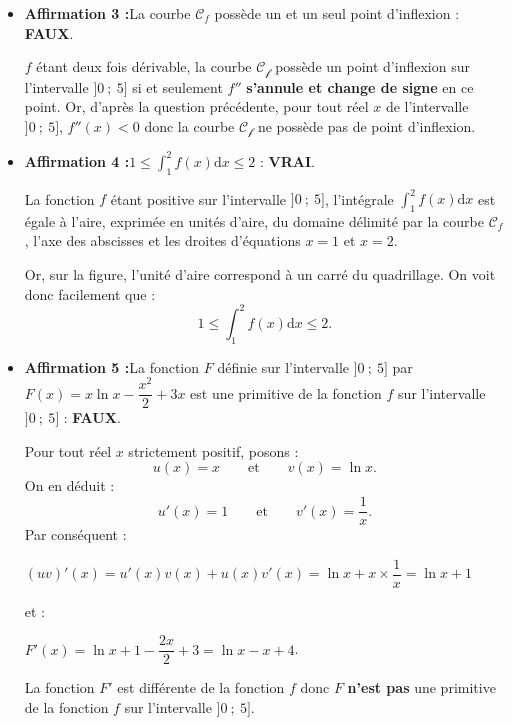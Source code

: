 \begin{corrige}
\begin{itemize}
          \par
          \item %
          \textbf{Affirmation 3 :}\quad La courbe $\mathscr{C}_f$ possède un et un seul point d'inflexion : \textbf{FAUX}.
          \par
          $f$ étant deux fois dérivable, la courbe $\mathscr{C_f}$ possède un point d'inflexion sur l'intervalle $]0~;~5]$ si et seulement $f''$ \textbf{s'annule et change de signe} en ce point. Or, d'après la question précédente, pour tout réel $x$ de l'intervalle $]0~;~5]$, $f''(x)<0$ donc la courbe $\mathscr{C_f}$ ne possède pas de point d'inflexion.
          \item %
          \textbf{Affirmation 4 :}\quad $1 \leqslant \displaystyle\int_{1}^{2}f(x)\text{d}x \leqslant 2$ : \textbf{VRAI}.
          \par
          La fonction $f$ étant positive sur l'intervalle $]0~;~5]$, l'intégrale $\displaystyle\int_{1}^{2}f(x)\text{d}x$ est égale à l'aire, exprimée en unités d'aire, du domaine délimité par la courbe $\mathscr{C}_f$, l'axe des abscisses et les droites d'équations $x=1$ et $x=2$.
          \par
          Or, sur la figure, l'unité d'aire correspond à un carré du quadrillage. On voit donc facilement que :
          \[ 1 \leqslant \displaystyle\int_{1}^{2}f(x)\text{d}x \leqslant 2. \]
          \item %
          \textbf{Affirmation 5 :}\quad La fonction $F$ définie sur l'intervalle $]0~;~5]$ par $F(x) =  x\ln x - \dfrac{x^2}{2} + 3x $ est une primitive de la fonction $f$ sur l'intervalle $]0~;~5]$ : \textbf{FAUX}.
          \par
          Pour tout réel $x$ strictement positif, posons :
          \[ u(x)=x \qquad \text{et} \qquad v(x)=\ln x. \]
          On en déduit :
          \[ u'(x)=1 \qquad \text{et} \qquad  v'(x)=\dfrac{1}{x}.\]
          Par conséquent :
          \par
          $(uv)'(x)=u'(x)v(x)+u(x)v'(x)=\ln x+x \times \dfrac{1}{x}=\ln x + 1$
          \par
          et :
          \par
          $F'(x)=\ln x + 1 - \dfrac{2x}{2} + 3 = \ln x - x + 4$.
          \par
          La fonction $F'$ est différente de la fonction $f$ donc $F$ \textbf{n'est pas} une primitive de la fonction $f$ sur l'intervalle $]0~;~5]$.
          \par
     \end{itemize}
\end{corrige}
